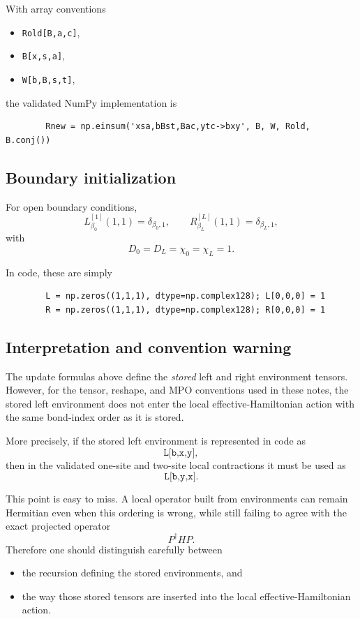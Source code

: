 \documentclass[aps,prb,onecolumn,nofootinbib]{revtex4-2}
\begin{document}
	With array conventions
	\begin{itemize}
		\item \texttt{Rold[B,a,c]},
		\item \texttt{B[x,s,a]},
		\item \texttt{W[b,B,s,t]},
	\end{itemize}
	the validated NumPy implementation is
	\begin{verbatim}
		Rnew = np.einsum('xsa,bBst,Bac,ytc->bxy', B, W, Rold, B.conj())
	\end{verbatim}
	
	\subsection{Boundary initialization}
	
	For open boundary conditions,
	\begin{equation}
		L^{[1]}_{\beta_0}(1,1)=\delta_{\beta_0,1},
		\qquad
		R^{[L]}_{\beta_L}(1,1)=\delta_{\beta_L,1},
	\end{equation}
	with
	\[
	D_0=D_L=\chi_0=\chi_L=1.
	\]
	
	In code, these are simply
	\begin{verbatim}
		L = np.zeros((1,1,1), dtype=np.complex128); L[0,0,0] = 1
		R = np.zeros((1,1,1), dtype=np.complex128); R[0,0,0] = 1
	\end{verbatim}
	
	\subsection{Interpretation and convention warning}
	
	The update formulas above define the \emph{stored} left and right environment tensors.
	However, for the tensor, reshape, and MPO conventions used in these notes, the stored left
	environment does not enter the local effective-Hamiltonian action with the same bond-index
	order as it is stored.
	
	More precisely, if the stored left environment is represented in code as
	\[
	\texttt{L[b,x,y]},
	\]
	then in the validated one-site and two-site local contractions it must be used as
	\[
	\texttt{L[b,y,x]}.
	\]
	
	This point is easy to miss. A local operator built from environments can remain Hermitian
	even when this ordering is wrong, while still failing to agree with the exact projected
	operator
	\[
	P^\dagger H P.
	\]
	Therefore one should distinguish carefully between
	\begin{itemize}
		\item the recursion defining the stored environments, and
		\item the way those stored tensors are inserted into the local effective-Hamiltonian action.
	\end{itemize}
	
\end{document}
